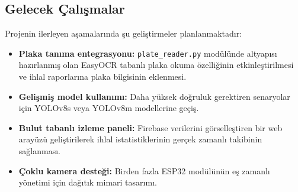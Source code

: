 \subsection{Gelecek Çalışmalar}

Projenin ilerleyen aşamalarında şu geliştirmeler planlanmaktadır:

\begin{itemize}
  \item \textbf{Plaka tanıma entegrasyonu:} \texttt{plate\_reader.py} modülünde altyapısı hazırlanmış olan EasyOCR tabanlı plaka okuma özelliğinin etkinleştirilmesi ve ihlal raporlarına plaka bilgisinin eklenmesi.
  \item \textbf{Gelişmiş model kullanımı:} Daha yüksek doğruluk gerektiren senaryolar için YOLOv8s veya YOLOv8m modellerine geçiş.
  \item \textbf{Bulut tabanlı izleme paneli:} Firebase verilerini görselleştiren bir web arayüzü geliştirilerek ihlal istatistiklerinin gerçek zamanlı takibinin sağlanması.
  \item \textbf{Çoklu kamera desteği:} Birden fazla ESP32 modülünün eş zamanlı yönetimi için dağıtık mimari tasarımı.
\end{itemize}

